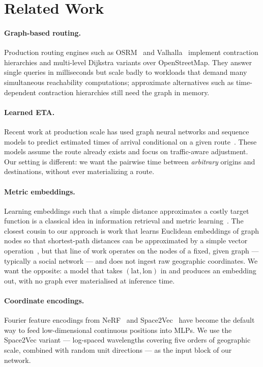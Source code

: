 \documentclass[11pt,a4paper]{article}
\begin{document}
\section{Related Work}

\paragraph{Graph-based routing.}
Production routing engines such as OSRM~\cite{luxen2011osrm} and
Valhalla~\cite{valhalla} implement contraction hierarchies and
multi-level Dijkstra variants over OpenStreetMap. They answer single
queries in milliseconds but scale badly to workloads that demand many
simultaneous reachability computations; approximate alternatives such
as time-dependent contraction hierarchies still need the graph in
memory.

\paragraph{Learned ETA.}
Recent work at production scale has used graph neural networks and
sequence models to predict estimated times of arrival conditional on
a given route~\cite{derrow2021eta}. These models assume the route
already exists and focus on traffic-aware adjustment. Our setting is
different: we want the pairwise time between \emph{arbitrary} origins
and destinations, without ever materializing a route.

\paragraph{Metric embeddings.}
Learning embeddings such that a simple distance approximates a costly
target function is a classical idea in information retrieval and
metric learning~\cite{hadsell2006dimensionality,schroff2015facenet}.
The closest cousin to our approach is work that learns Euclidean
embeddings of graph nodes so that shortest-path distances can be
approximated by a simple vector operation~\cite{rizi2018shortest},
but that line of work operates on the nodes of a fixed, given graph
--- typically a social network --- and does not ingest raw geographic
coordinates. We want the opposite: a model that takes
$(\text{lat}, \text{lon})$ in and produces an embedding out, with no
graph ever materialised at inference time.

\paragraph{Coordinate encodings.}
Fourier feature encodings from NeRF~\cite{tancik2020fourier} and
Space2Vec~\cite{mai2020space2vec} have become the default way to feed
low-dimensional continuous positions into MLPs. We use the Space2Vec
variant --- log-spaced wavelengths covering five orders of geographic
scale, combined with random unit directions --- as the input block
of our network.
\end{document}
